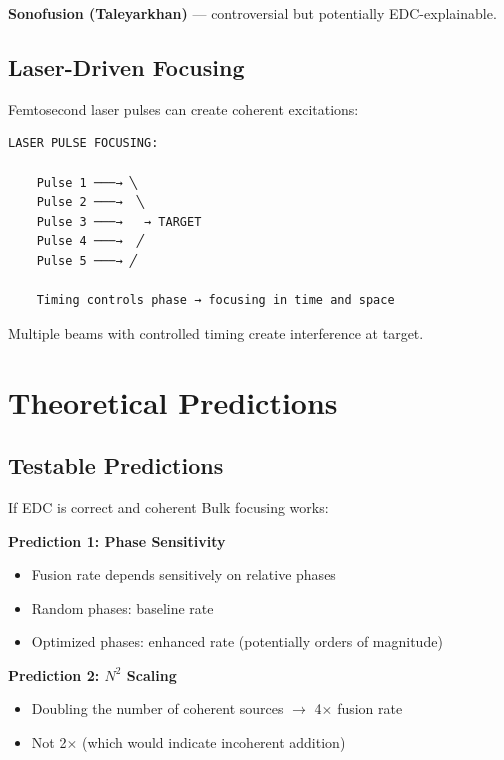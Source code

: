 \documentclass[12pt,a4paper]{article}
\begin{document}
\textbf{Sonofusion (Taleyarkhan)} --- controversial but potentially EDC-explainable.

\subsection{Laser-Driven Focusing}

Femtosecond laser pulses can create coherent excitations:

\begin{verbatim}
LASER PULSE FOCUSING:

    Pulse 1 ───→ ╲
    Pulse 2 ───→  ╲
    Pulse 3 ───→   → TARGET
    Pulse 4 ───→  ╱
    Pulse 5 ───→ ╱
    
    Timing controls phase → focusing in time and space
\end{verbatim}

Multiple beams with controlled timing create interference at target.

\section{Theoretical Predictions}

\subsection{Testable Predictions}

If EDC is correct and coherent Bulk focusing works:

\begin{prediction}
\textbf{Prediction 1: Phase Sensitivity}
\begin{itemize}
    \item Fusion rate depends sensitively on relative phases
    \item Random phases: baseline rate
    \item Optimized phases: enhanced rate (potentially orders of magnitude)
\end{itemize}
\end{prediction}

\begin{prediction}
\textbf{Prediction 2: $N^2$ Scaling}
\begin{itemize}
    \item Doubling the number of coherent sources $\to$ 4$\times$ fusion rate
    \item Not 2$\times$ (which would indicate incoherent addition)
\end{itemize}
\end{prediction}
\end{document}
